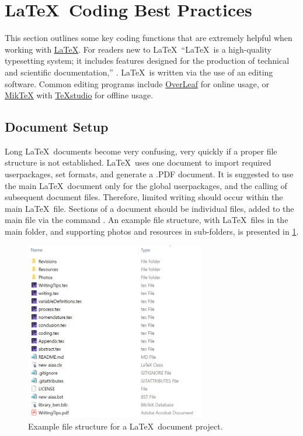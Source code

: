 \section{\LaTeX~Coding Best Practices} \label{sec:Conclusion}
This section outlines some key coding functions that are extremely helpful when working with \href{https://www.latex-project.org/}{\LaTeX}. 
For readers new to \LaTeX\, ``LaTeX\ is a high-quality typesetting system; it includes features designed for the production of technical and scientific documentation,'' \cite{latexExplanation}. 
\LaTeX\ is written via the use of an editing software. 
Common editing programs include \href{https://www.overleaf.com/}{OverLeaf} for online usage, or \href{https://miktex.org/}{Mik\TeX} with \href{https://www.texstudio.org/}{\TeX studio} for offline usage. 

\subsection{Document Setup}
Long \LaTeX\ documents become very confusing, very quickly if a proper file structure is not established. 
\LaTeX\ uses one document to import required userpackages, set formats, and generate a .PDF document. 
It is suggested to use the main \LaTeX\ document only for the global userpackages, and the calling of subsequent document files. 
Therefore, limited writing should occur within the main \LaTeX\ file. 
Sections of a document should be individual files, added to the main file via the command \verb*||. 
An example file structure, with \LaTeX\ files in the main folder, and supporting photos and resources in sub-folders, is presented in \cref{fig:documentSetupExample}.


\begin{figure}[hbt!]
	\centering
	\captionsetup{width=0.7\textwidth}
	\includegraphics[width=0.7\textwidth]{Photos/Figures/projectStructure.png}
	\caption{Example file structure for a \LaTeX\ document project.}
	\label{fig:documentSetupExample}
	\hfill
\end{figure}

